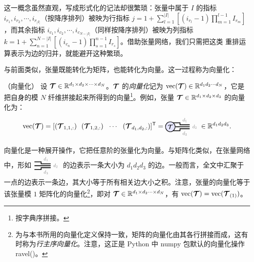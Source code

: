 这一概念虽然直观，写成形式化的记法却很繁琐：张量中属于 $I$ 的指标 $i_{r_1},i_{r_2},\cdots, i_{r_{|I|}}$（按降序排列）被映为行指标 $
j = 1+\sum_{l=1}^{|I|}
\left[(i_{r_l}-1)\prod_{m=1}^{l-1}I_{r_m}\right]
$，而其余指标 $i_{c_1},i_{c_2},\cdots, i_{c_{N-|I|}}$（同样按降序排列）被映为列指标 $k  = 1+\sum_{n=1}^{N - |I|}
\left[(i_{c_n}-1)\prod_{s=1}^{n-1}I_{r_s}\right]$。借助张量网络，我们只需把这类 
重排运算表示为边的归并，就能避开这种繁琐。 






与前面类似，张量既能转化为矩阵，也能转化为向量。这一过程称为向量化：
\begin{definition}（向量化）\label{def:vectorization}
设 $\Tt\in\RR^{d_1\times d_2\times\cdots\times d_N}$。$\Tt$ 的\emph{向量化}记为 $\vectorize(\Tt)\in\RR^{d_1d_2\cdots d_N}$，它是把自身的模 $N$ 纤维拼接起来所得到的向量\footnote{按字典序拼接。}。例如，张量 $\Tt\in\RR^{d_1\times d_2\times d_3}$ 的向量化为：
$$\vectorize(\Tt) =    
[(\Tt_{1,1,:})\ \  (\Tt_{1,2,:})\ \  \cdots \ \ (\Tt_{d_1,d_2,:})]^\ts
=
\begin{tikzpicture}[baseline=\baseline]
    \tikzset{tensor/.style = {minimum size = 0.5cm,shape = circle,thick,draw=black,inner sep = 0pt}, edge/.style = {thick,line width=.4mm},every loop/.style={}}
    \def\y{0}
    \def\x{0}
    \node[tensor,fill=blue!10!white] (A) at (\x,\y){\scalebox{0.85}{$\Tt$}};
    \draw[edge] (\x+0.15,\y+0.2) -- (\x+0.5,\y+0.2) -- (\x+0.5,\y+0.1) -- (\x+1,\y+0.1) node [midway,above]
    {\scalebox{0.7}{\dimcolor{$d_1$}}};
     \draw[edge] (A) -- (\x+1,\y)node [right]
    {\scalebox{0.7}{\dimcolor{$d_2$}}};

    \draw[edge] (\x+0.15,\y-0.2) -- (\x+0.5,\y-0.2)-- (\x+0.5,\y-0.1)-- (\x+1,\y-0.1) node [midway,below]
    {\scalebox{0.7}{\dimcolor{$d_3$}}};
    \end{tikzpicture}\in\RR^{d_1d_2d_3}.
$$
\end{definition}

向量化是一种展开操作，它把任意阶的张量化为向量。与矩阵化类似，在张量网络中，形如
$
\begin{tikzpicture}[baseline=\baseline]
    \tikzset{tensor/.style = {minimum size = 0.5cm,shape = circle,thick,draw=black,inner sep = 0pt}, edge/.style = {thick,line width=.4mm},every loop/.style={}}
    \def\y{0}
    \def\x{0}
    \draw[edge] (\x+0.15,\y+0.2) -- (\x+0.5,\y+0.2) -- (\x+0.5,\y+0.1) -- (\x+1,\y+0.1) node [midway,above]
    {\scalebox{0.7}{\textcolor{gray}{$d_1$}}};
    \draw[edge] (\x+0.15,\y) -- (\x+1,\y)node [right]
    {\scalebox{0.7}{\textcolor{gray}{$d_2$}}};
    \draw[edge] (\x+0.15,\y-0.2) -- (\x+0.5,\y-0.2)-- (\x+0.5,\y-0.1)-- (\x+1,\y-0.1) 
node [midway,below]
    {\scalebox{0.7}{\dimcolor{$d_3$}}};
    \end{tikzpicture}
$ 的边表示一条大小为 $d_1d_2d_3$ 的边。一般而言，全文中汇聚于一点的边表示一条边，其大小等于所有相关边大小之积。注意，张量的向量化等于该张量模 $1$ 矩阵化的向量化\footnote{为与本书所用的向量化定义保持一致，矩阵的向量化由其各行拼接而成，这有时称为\emph{行主序向量化}。注意，这正是 \textsf{Python} 中 \textsf{numpy} 包默认的向量化操作 \textsf{ravel()}。}，即对 $\bm{\mathcal{T}}\in\mathbb{R}^{d_1\times d_2\cdots \times d_N}$，有 $\mathrm{vec}(\bm{\mathcal{T}}) = \mathrm{vec}(\bm{\mathcal{T}}_{(1)})$。




